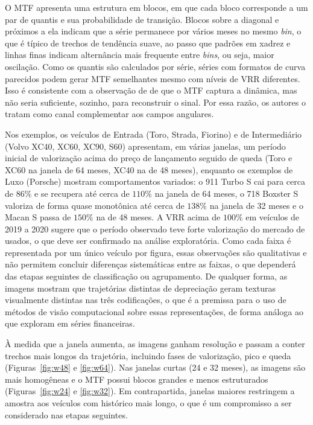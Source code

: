 O MTF apresenta uma estrutura em blocos, em que cada bloco corresponde a um par de quantis e sua probabilidade de transição. Blocos sobre a diagonal e próximos a ela indicam que a série permanece por vários meses no mesmo \textit{bin}, o que é típico de trechos de tendência suave, ao passo que padrões em xadrez e linhas finas indicam alternância mais frequente entre \textit{bins}, ou seja, maior oscilação. Como os quantis são calculados por série, séries com formatos de curva parecidos podem gerar MTF semelhantes mesmo com níveis de VRR diferentes. Isso é consistente com a observação de \cite{wang2015imaging} de que o MTF captura a dinâmica, mas não seria suficiente, sozinho, para reconstruir o sinal. Por essa razão, os autores o tratam como canal complementar aos campos angulares.

Nos exemplos, os veículos de Entrada (Toro, Strada, Fiorino) e de Intermediário (Volvo XC40, XC60, XC90, S60) apresentam, em várias janelas, um período inicial de valorização acima do preço de lançamento seguido de queda (Toro e XC60 na janela de 64 meses, XC40 na de 48 meses), enquanto os exemplos de Luxo (Porsche) mostram comportamentos variados: o 911 Turbo S cai para cerca de $86\%$ e se recupera até cerca de $110\%$ na janela de 64 meses, o 718 Boxster S valoriza de forma quase monotônica até cerca de $138\%$ na janela de 32 meses e o Macan S passa de $150\%$ na de 48 meses. A VRR acima de $100\%$ em veículos de 2019 a 2020 sugere que o período observado teve forte valorização do mercado de usados, o que deve ser confirmado na análise exploratória. Como cada faixa é representada por um único veículo por figura, essas observações são qualitativas e não permitem concluir diferenças sistemáticas entre as faixas, o que dependerá das etapas seguintes de classificação ou agrupamento. De qualquer forma, as imagens mostram que trajetórias distintas de depreciação geram texturas visualmente distintas nas três codificações, o que é a premissa para o uso de métodos de visão computacional sobre essas representações, de forma análoga ao que \cite{wu2023imaging} exploram em séries financeiras.

À medida que a janela aumenta, as imagens ganham resolução e passam a conter trechos mais longos da trajetória, incluindo fases de valorização, pico e queda (Figuras~\ref{fig:w48} e \ref{fig:w64}). Nas janelas curtas (24 e 32 meses), as imagens são mais homogêneas e o MTF possui blocos grandes e menos estruturados (Figuras~\ref{fig:w24} e \ref{fig:w32}). Em contrapartida, janelas maiores restringem a amostra aos veículos com histórico mais longo, o que é um compromisso a ser considerado nas etapas seguintes.
